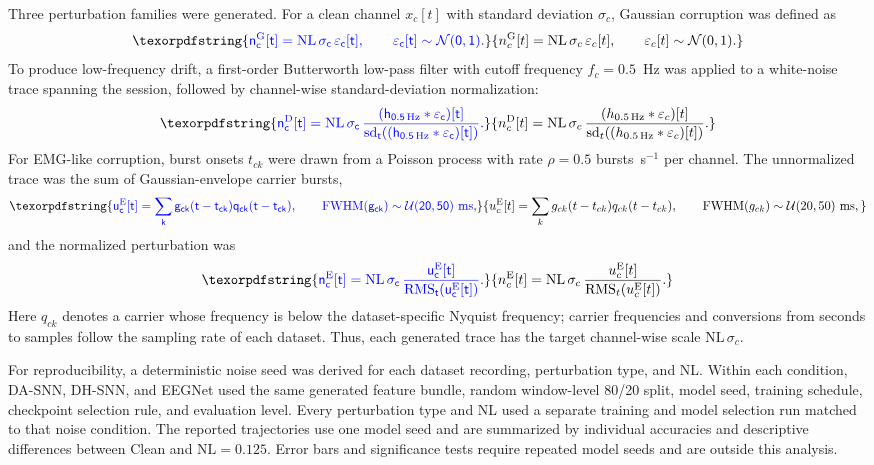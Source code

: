\documentclass[12pt]{article}
\providecommand{\DIFaddtex}[1]{{\protect\color{blue}\sf #1}}
\providecommand{\DIFadd}[1]{\texorpdfstring{\DIFaddtex{#1}}{#1}}
\begin{document}
\DIFadd{Three perturbation families were generated. For a clean channel $x_c[t]$ with standard deviation $\sigma_c$, Gaussian corruption was defined as
}\begin{equation}
\DIFadd{n^{\mathrm{G}}_c[t]=\mathrm{NL}\,\sigma_c\,\varepsilon_c[t],
\qquad \varepsilon_c[t]\sim\mathcal{N}(0,1).
\label{eq:gaussian_perturbation}
}\end{equation}
\DIFadd{To produce low-frequency drift, a first-order Butterworth low-pass filter with cutoff frequency $f_c=0.5$~Hz was applied to a white-noise trace spanning the session, followed by channel-wise standard-deviation normalization:
}\begin{equation}
\DIFadd{n^{\mathrm{D}}_c[t]=\mathrm{NL}\,\sigma_c\,
\frac{(h_{0.5\,\mathrm{Hz}}\ast\varepsilon_c)[t]}{\operatorname{sd}_t\!\left((h_{0.5\,\mathrm{Hz}}\ast\varepsilon_c)[t]\right)}.
\label{eq:drift_perturbation}
}\end{equation}
\DIFadd{For EMG-like corruption, burst onsets $t_{ck}$ were drawn from a Poisson process with rate $\rho=0.5$ bursts~s$^{-1}$ per channel. The unnormalized trace was the sum of Gaussian-envelope carrier bursts,
}\begin{equation}
\DIFadd{u^{\mathrm{E}}_c[t]=\sum_k g_{ck}(t-t_{ck})q_{ck}(t-t_{ck}),
\qquad
\mathrm{FWHM}(g_{ck})\sim\mathcal{U}(20,50)~\mathrm{ms},
\label{eq:emg_envelope}
}\end{equation}
\DIFadd{and the normalized perturbation was
}\begin{equation}
\DIFadd{n^{\mathrm{E}}_c[t]=\mathrm{NL}\,\sigma_c\,
\frac{u^{\mathrm{E}}_c[t]}{\mathrm{RMS}_t\!\left(u^{\mathrm{E}}_c[t]\right)}.
\label{eq:emg_perturbation}
}\end{equation}
\DIFadd{Here $q_{ck}$ denotes a carrier whose frequency is below the dataset-specific Nyquist frequency; carrier frequencies and conversions from seconds to samples follow the sampling rate of each dataset. Thus, each generated trace has the target channel-wise scale $\mathrm{NL}\,\sigma_c$.
}

\DIFadd{For reproducibility, a deterministic noise seed was derived for each dataset recording, perturbation type, and NL. Within each condition, DA-SNN, DH-SNN, and EEGNet used the same generated feature bundle, random window-level 80/20 split, model seed, training schedule, checkpoint selection rule, and evaluation level. Every perturbation type and NL used a separate training and model selection run matched to that noise condition. The reported trajectories use one model seed and are summarized by individual accuracies and descriptive differences between Clean and $\mathrm{NL}=0.125$. Error bars and significance tests require repeated model seeds and are outside this analysis.
}
\end{document}
